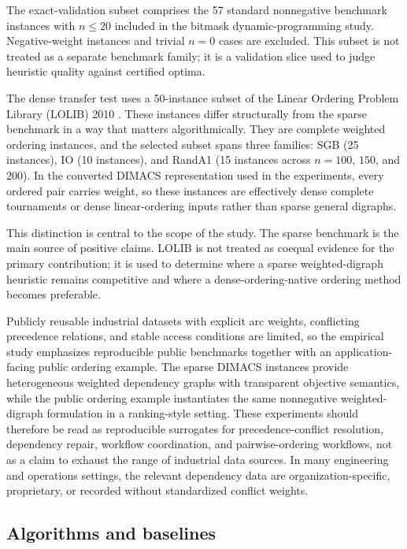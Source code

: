 The exact-validation subset comprises the 57 standard nonnegative benchmark instances with \(n \le 20\) included in the bitmask dynamic-programming study. Negative-weight instances and trivial \(n = 0\) cases are excluded. This subset is not treated as a separate benchmark family; it is a validation slice used to judge heuristic quality against certified optima.

The dense transfer test uses a 50-instance subset of the Linear Ordering Problem Library (LOLIB) 2010 \cite{MRD12,lolib_library}. These instances differ structurally from the sparse benchmark in a way that matters algorithmically. They are complete weighted ordering instances, and the selected subset spans three families: SGB (25 instances), IO (10 instances), and RandA1 (15 instances across \(n=100\), \(150\), and \(200\)). In the converted DIMACS representation used in the experiments, every ordered pair carries weight, so these instances are effectively dense complete tournaments or dense linear-ordering inputs rather than sparse general digraphs.

This distinction is central to the scope of the study. The sparse benchmark is the main source of positive claims. LOLIB is not treated as coequal evidence for the primary contribution; it is used to determine where a sparse weighted-digraph heuristic remains competitive and where a dense-ordering-native ordering method becomes preferable.

Publicly reusable industrial datasets with explicit arc weights, conflicting precedence relations, and stable access conditions are limited, so the empirical study emphasizes reproducible public benchmarks together with an application-facing public ordering example. The sparse DIMACS instances provide heterogeneous weighted dependency graphs with transparent objective semantics, while the public ordering example instantiates the same nonnegative weighted-digraph formulation in a ranking-style setting. These experiments should therefore be read as reproducible surrogates for precedence-conflict resolution, dependency repair, workflow coordination, and pairwise-ordering workflows, not as a claim to exhaust the range of industrial data sources. In many engineering and operations settings, the relevant dependency data are organization-specific, proprietary, or recorded without standardized conflict weights.

\subsection{Algorithms and baselines}

